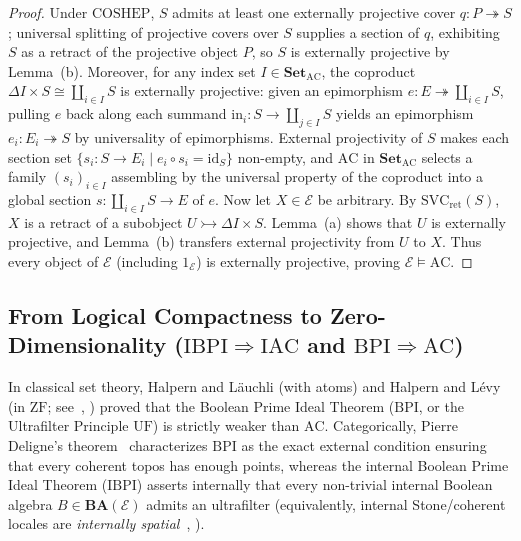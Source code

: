 \documentclass[10pt,twoside,openright]{book}
\theoremstyle{crmplain}
\theoremstyle{crmdef}
\theoremstyle{crmremark}
\begin{document}
\begin{proof}
Under $\mathrm{COSHEP}$, $S$ admits at least one externally projective cover $q : P \twoheadrightarrow S$; universal splitting of projective covers over $S$ supplies a section of $q$, exhibiting $S$ as a retract of the projective object $P$, so $S$ is externally projective by Lemma~(b). Moreover, for any index set $I \in \mathbf{Set}_{\mathrm{AC}}$, the coproduct $\Delta I \times S \cong \coprod_{i \in I} S$ is externally projective: given an epimorphism $e : E \twoheadrightarrow \coprod_{i \in I} S$, pulling $e$ back along each summand $\mathrm{in}_i : S \to \coprod_{j \in I} S$ yields an epimorphism $e_i : E_i \twoheadrightarrow S$ by universality of epimorphisms. External projectivity of $S$ makes each section set $\{s_i : S \to E_i \mid e_i \circ s_i = \mathrm{id}_S\}$ non-empty, and $\mathrm{AC}$ in $\mathbf{Set}_{\mathrm{AC}}$ selects a family $(s_i)_{i \in I}$ assembling by the universal property of the coproduct into a global section $s : \coprod_{i \in I} S \to E$ of $e$. Now let $X \in \mathcal{E}$ be arbitrary. By $\mathrm{SVC}_{\mathrm{ret}}(S)$, $X$ is a retract of a subobject $U \rightarrowtail \Delta I \times S$. Lemma~(a) shows that $U$ is externally projective, and Lemma~(b) transfers external projectivity from $U$ to $X$. Thus every object of $\mathcal{E}$ (including $1_{\mathcal{E}}$) is externally projective, proving $\mathcal{E} \models \mathrm{AC}$.
\end{proof}

\subsection{\texorpdfstring{From Logical Compactness to Zero-Dimensionality ($\mathrm{IBPI} \Rightarrow \mathrm{IAC}$ and $\mathrm{BPI} \Rightarrow \mathrm{AC}$)}{From Logical Compactness to Zero-Dimensionality (IBPI => IAC and BPI => AC)}}

In classical set theory, Halpern and L\"auchli (with atoms) and Halpern and L\'evy~\cite{HalpernLevy71} (in $\mathrm{ZF}$; see~\cite[Ch.~II, \S\S 3--4]{Johnstone82}, \cite[\S D3.3]{Johnstone02}) proved that the Boolean Prime Ideal Theorem ($\mathrm{BPI}$, or the Ultrafilter Principle $\mathrm{UF}$) is strictly weaker than $\mathrm{AC}$. Categorically, Pierre Deligne's theorem~\cite[Exp.~VI, Appendice]{Deligne72} characterizes $\mathrm{BPI}$ as the exact external condition ensuring that every coherent topos has enough points, whereas the internal Boolean Prime Ideal Theorem ($\mathrm{IBPI}$) asserts internally that every non-trivial internal Boolean algebra $B \in \mathbf{BA}(\mathcal{E})$ admits an ultrafilter (equivalently, internal Stone/coherent locales are \emph{internally spatial}~\cite[Ch.~II, \S\S 3--4]{Johnstone82}, \cite[\S D3.3, Thm.~D3.3.13]{Johnstone02}).
\end{document}
